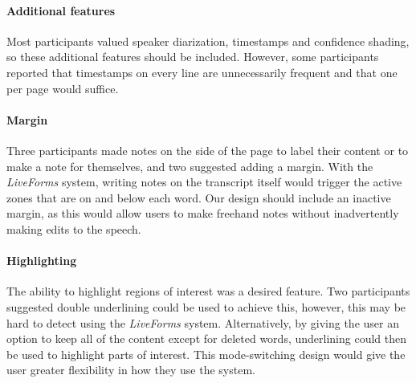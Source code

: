 
\paragraph{Additional features}
Most participants valued speaker diarization, timestamps and confidence shading, so these additional features should be
included.  However, some participants reported that timestamps on every line are unnecessarily frequent and that one
per page would suffice.

\paragraph{Margin}
Three participants made notes on the side of the page to label their content or to make a note for themselves, and two
suggested adding a margin. With the \textit{Live\texttrademark Forms} system, writing notes on the transcript itself would trigger the active
zones that are on and below each word. Our design should include an inactive margin, as this would allow users to make
freehand notes without inadvertently making edits to the speech.

\paragraph{Highlighting}
The ability to highlight regions of interest was a desired feature. Two participants suggested double underlining could
be used to achieve this, however, this may be hard to detect using the \textit{Live\texttrademark Forms} system.
Alternatively, by giving the user an option to keep all of the content except for deleted words, underlining could then
be used to highlight parts of interest. This mode-switching design would give the user greater flexibility in how they
use the system.


